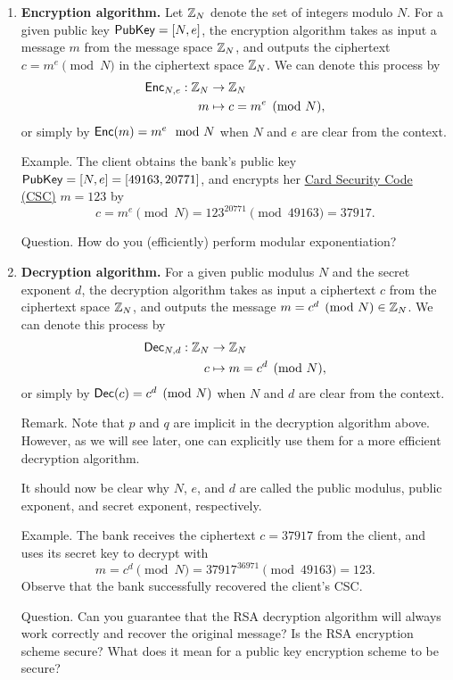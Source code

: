 \begin{enumerate}
    \item {\bf Encryption algorithm.} Let $\mathbb{Z}_N$ denote the set of integers modulo $N$. 
    For a given public key ${\sf PubKey} = [N, e]$, the encryption algorithm takes as input a message 
    $m$ from the message space $\mathbb{Z}_N$, and outputs the ciphertext $c = m^e \pmod N$ in the 
    ciphertext space $\mathbb{Z}_N$. We can denote this process by 
    \begin{align*}
        {\sf Enc}_{N,e} : \mathbb{Z}_N &\to \mathbb{Z}_N \\
        m &\mapsto c = m^e \pmod N,
    \end{align*}
    or simply by ${\sf Enc}(m) = m^e \mod N$ when $N$ and $e$ are clear from the context.
    
    {\sc Example.} The client obtains the bank’s public key ${\sf PubKey} = [N,e] = [49163,20771]$, 
    and encrypts her \href{https://en.wikipedia.org/wiki/Card_security_code}{Card Security Code (CSC)} $m=123$ by 
    \[ c = m^e \pmod N = 123^{20771} \pmod {49163} = 37917. \]
    
    {\sc Question.} How do you (efficiently) perform modular exponentiation?
    
    \item {\bf Decryption algorithm.} For a given public modulus $N$ and the secret exponent $d$, the decryption algorithm takes as input a ciphertext $c$ from the ciphertext space $\mathbb{Z}_N$, 
    and outputs the message $m = c^d \pmod N \in \mathbb{Z}_N$. We can denote this process by 
    \begin{align*}
        {\sf Dec}_{N,d} : \mathbb{Z}_N &\to \mathbb{Z}_N \\
        c &\mapsto m = c^d \pmod N,
    \end{align*}
    or simply by ${\sf Dec}(c) = c^d \pmod N$ when $N$ and $d$ are clear from the context.
    
    {\sc Remark.} Note that $p$ and $q$ are implicit in the decryption algorithm above. However, as we will see later, one can explicitly use them for a more efficient decryption algorithm.
    
    It should now be clear why $N$, $e$, and $d$ are called the public modulus, public exponent, and secret exponent, respectively.
    
    {\sc Example.} The bank receives the ciphertext $c=37917$ from the client, and uses its secret key to decrypt with 
    \[ m = c^d \pmod N = 37917^{36971} \pmod {49163} = 123. \]
    Observe that the bank successfully recovered the client's CSC. 
    
    {\sc Question.} Can you guarantee that the RSA decryption algorithm will always work correctly and recover the original message? Is the RSA encryption scheme secure? What does it mean for a public key encryption scheme to be secure?
\end{enumerate}